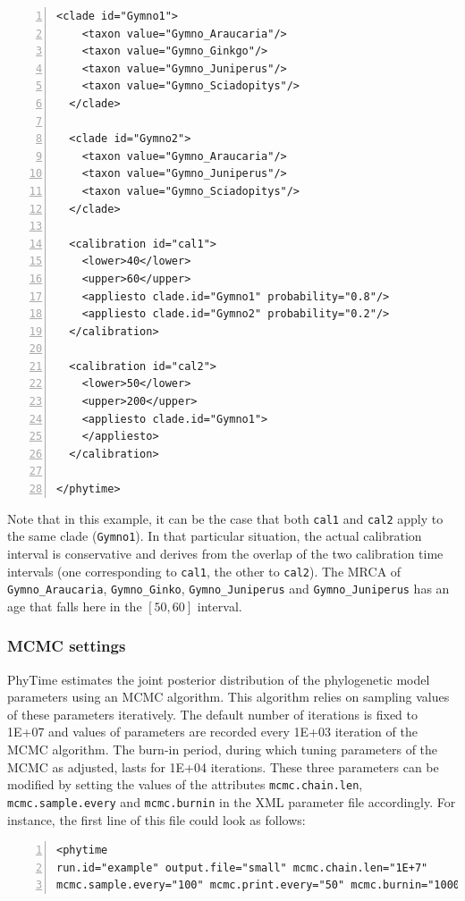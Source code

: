 \documentclass[a4paper,12pt]{article}
\newcommand{\x}[1]{\texttt{#1}}
\begin{document}
\begin{Verbatim}[frame=single, label=Calibrating with uncertainty, samepage=true, baselinestretch=0.5,
  fontsize=\small, numbers=left]
  <clade id="Gymno1">
    <taxon value="Gymno_Araucaria"/>
    <taxon value="Gymno_Ginkgo"/>
    <taxon value="Gymno_Juniperus"/>
    <taxon value="Gymno_Sciadopitys"/>
  </clade>

  <clade id="Gymno2">
    <taxon value="Gymno_Araucaria"/>
    <taxon value="Gymno_Juniperus"/>
    <taxon value="Gymno_Sciadopitys"/>
  </clade>
  
  <calibration id="cal1">
    <lower>40</lower>
    <upper>60</upper>
    <appliesto clade.id="Gymno1" probability="0.8"/>
    <appliesto clade.id="Gymno2" probability="0.2"/>
  </calibration>

  <calibration id="cal2">
    <lower>50</lower>
    <upper>200</upper>
    <appliesto clade.id="Gymno1">
    </appliesto>
  </calibration>

</phytime>
\end{Verbatim}

Note that in this example, it can be the case that both \x{cal1} and \x{cal2} apply to the same
clade (\x{Gymno1}). In that particular situation, the actual calibration interval 
is conservative and derives from the overlap of the two calibration time intervals (one
corresponding to \x{cal1}, the other to \x{cal2}). The MRCA of
\x{Gymno\_Araucaria}, \x{Gymno\_Ginko}, \x{Gymno\_Juniperus} and \x{Gymno\_Juniperus} has an age
that falls here in the $[50,60]$ interval.

\subsubsection{MCMC settings}\label{sec:phytimesettings}

PhyTime estimates the joint posterior distribution  of the phylogenetic model parameters  using an
MCMC algorithm. This algorithm relies on sampling values of these parameters iteratively. The
default number of iterations is fixed to 1E+07 and values of parameters are recorded every 1E+03
iteration of the MCMC algorithm. The burn-in period, during which tuning parameters of the MCMC as
adjusted, lasts for 1E+04 iterations. These three parameters can be modified by setting the values
of the attributes \x{mcmc.chain.len}, \x{mcmc.sample.every} and \x{mcmc.burnin} in the XML parameter
file accordingly. For instance, the first line of this file could look as follows: 
\vspace{0.2cm}
\begin{Verbatim}[frame=single, label=MCMC settings, samepage=true, baselinestretch=0.5,
  fontsize=\small, numbers=left]
<phytime
run.id="example" output.file="small" mcmc.chain.len="1E+7" 
mcmc.sample.every="100" mcmc.print.every="50" mcmc.burnin="10000">
\end{Verbatim}
\end{document}
